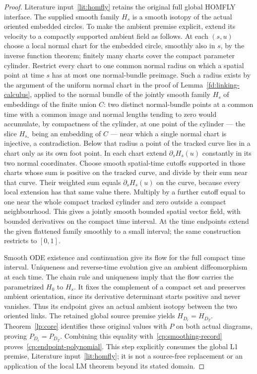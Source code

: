 \begin{proof}
Literature input~\ref{lit:homfly} retains the original full global
HOMFLY interface. The supplied smooth family $H_s$ is a smooth isotopy
of the actual oriented embedded circles. To make the ambient premise
explicit, extend its velocity to a compactly supported ambient field
as follows. At each $(s,u)$ choose a local normal chart for the embedded
circle, smoothly also in $s$, by the inverse function theorem; finitely
many charts cover the compact parameter cylinder. Restrict every chart to
one common normal radius on which a spatial point at time $s$ has at most
one normal-bundle preimage. Such a radius exists by the argument of the
uniform normal chart in the proof of Lemma~\ref{fd:linking-calculus},
applied to the normal bundle of the jointly smooth family $H_s$ of
embeddings of the finite union $C$: two distinct normal-bundle points at a
common time with a common image and normal lengths tending to zero would
accumulate, by compactness of the cylinder, at one point of the cylinder
--- the slice $H_{s_*}$ being an embedding of $C$ --- near which a single
normal chart is injective, a contradiction. Below that radius a point of
the tracked curve lies in a chart only as its own foot point. In each
chart extend
$\partial_sH_s(u)$ constantly in its two normal coordinates. Choose
smooth spatial-time cutoffs supported in those charts whose sum is
positive on the tracked curve, and divide by their sum near that curve.
Their weighted sum equals $\partial_sH_s(u)$ on the curve, because every
local extension has that same value there. Multiply by a further cutoff
equal to one near the whole compact tracked cylinder and zero outside a
compact neighbourhood. This gives a jointly smooth bounded spatial
vector field, with bounded derivatives on the compact time interval.
At the time endpoints extend the given flattened family smoothly to a
small interval; the same construction restricts to $[0,1]$.

Smooth ODE existence and continuation give its flow for the full compact
time interval. Uniqueness and reverse-time evolution give an ambient
diffeomorphism at each time. The chain rule and uniqueness imply that
the flow carries the parametrized $H_0$ to $H_s$. It fixes the complement
of a compact set and preserves ambient orientation, since its derivative
determinant starts positive and never vanishes. Thus its endpoint gives
an actual ambient isotopy between the two oriented links. The retained
global source premise yields $H_{D_\epsilon}=H_{D_T}$.
Theorem~\ref{lp:core} identifies these original values with $P$ on both
actual diagrams, proving $P_{D_\epsilon}=P_{D_T}$. Combining this equality
with~\eqref{cp:smoothing-record} proves~\eqref{cp:endpoint-polynomial}.
This step explicitly consumes the global L1 premise,
Literature input~\ref{lit:homfly}; it is not a source-free replacement
or an application of the local LM theorem beyond its stated domain.


\end{proof}
